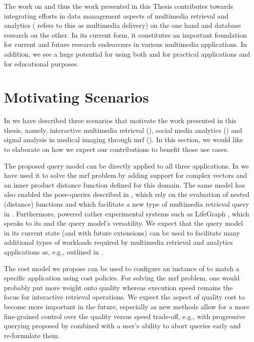 The work on \cottontail{} and thus the work presented in this Thesis contributes towards integrating efforts in data management aspects of multimedia retrieval and analytics (\cite{Vrochidis:2019Big} refers to this as multimedia delivery) on the one hand and database research on the other. In its current form, it constitutes an important foundation for current and future research endeavours in various multimedia applications. In addition, we see a huge potential for using both \vitrivr{} and \cottontail{} for practical applications and for educational purposes.

\section{Motivating Scenarios}

In  we have described three scenarios that motivate the work presented in this thesis, namely, interactive multimedia retrieval (), social media analytics () and signal analysis in medical imaging through \acrshort{mrf} (). In this section, we would like to elaborate on how we expect our contributions to benefit those use cases.

The proposed query model can be directly applied to all three applications. In \cite{Huerbin:2020Retrieval,Zihlmann:2021Magnetic} we have used it to solve the \acrshort{mrf} problem by adding support for complex vectors and an inner product distance function defined for this domain. The same model has also enabled the pose-queries described in \cite{Heller:2022Multi}, which rely on the evaluation of nested (distance) functions and which facilitate a new type of multimedia retrieval query in \vitrivr. Furthermore, \cottontail{} powered rather experimental systems such as LifeGraph \cite{Rossetto:2021Exploring}, which speaks to its and the query model's versatility. We expect that the query model in its current state (and with future extensions) can be used to facilitate many additional types of workloads required by multimedia retrieval and analytics applications as, e.g., outlined in \cite{Seebacher:2017Visual}.

The cost model we propose can be used to configure an instance of \cottontail{} to match a specific application using cost policies. For solving the \acrshort{mrf} problem, one would probably put more weight onto quality whereas execution speed remains the focus for interactive retrieval operations. We expect the aspect of quality cost to become more important in the future, especially as new methods allow for a more fine-grained control over the quality versus speed trade-off, e.g., with progressive querying proposed by \cite{Giangreco:2018Database} combined with a user's ability to abort queries early and re-formulate them.

